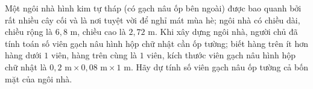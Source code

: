 \begin{ex}
Một ngôi nhà hình kim tự tháp (có gạch nâu ốp bên ngoài) được bao quanh bởi rất nhiều cây cối và là nơi tuyệt vời để nghỉ mát mùa hè; ngôi nhà có chiều dài, chiều rộng là $6{,}8$ m, chiều cao là $2{,}72$ m. Khi xây dựng ngôi nhà, người chủ đã tính toán số viên gạch nâu hình hộp chữ nhật cần ốp tường; biết hàng trên ít hơn hàng dưới $1$ viên, hàng trên cùng là $1$ viên, kích thước viên gạch nâu hình hộp chữ nhật là $0{,}2\text{ m}\times0{,}08\text{ m}\times1\text{ m}$. Hãy dự tính số viên gạch nâu ốp tường cả bốn mặt của ngôi nhà.
\end{ex}
